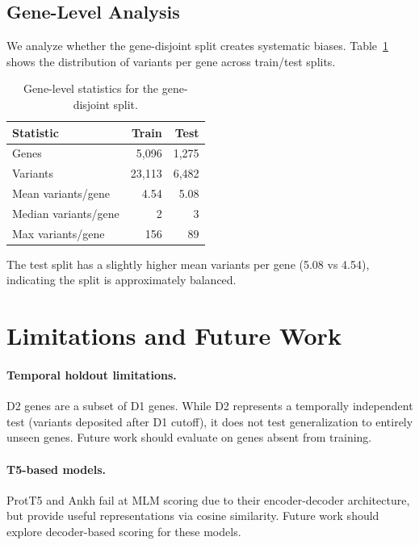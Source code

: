 \documentclass[9pt]{article}
\begin{document}
\subsection{Gene-Level Analysis}

We analyze whether the gene-disjoint split creates systematic biases. Table~\ref{tab:gene_analysis} shows the distribution of variants per gene across train/test splits.

\begin{table}[h]
\centering
\caption{Gene-level statistics for the gene-disjoint split.}
\label{tab:gene_analysis}
\small
\begin{tabular}{lrr}
\toprule
\textbf{Statistic} & \textbf{Train} & \textbf{Test} \\
\midrule
Genes & 5,096 & 1,275 \\
Variants & 23,113 & 6,482 \\
Mean variants/gene & 4.54 & 5.08 \\
Median variants/gene & 2 & 3 \\
Max variants/gene & 156 & 89 \\
\bottomrule
\end{tabular}
\end{table}

The test split has a slightly higher mean variants per gene (5.08 vs 4.54), indicating the split is approximately balanced.

\section{Limitations and Future Work}

\paragraph{Temporal holdout limitations.} D2 genes are a subset of D1 genes. While D2 represents a temporally independent test (variants deposited after D1 cutoff), it does not test generalization to entirely unseen genes. Future work should evaluate on genes absent from training.

\paragraph{T5-based models.} ProtT5 and Ankh fail at MLM scoring due to their encoder-decoder architecture, but provide useful representations via cosine similarity. Future work should explore decoder-based scoring for these models.
\end{document}

